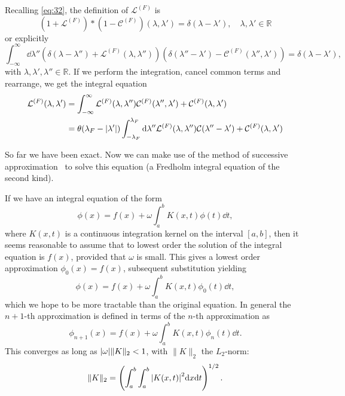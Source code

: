 \documentclass[11pt, a4paper]{report} %
\begin{document}
Recalling \cref{eq:32}, the definition of \(\mathcal{L}^{(F)}\) is~\cite{Caux2015}
\begin{equation}
	\left(1 + \mathcal{L}^{(F)}\right) * \left(1 - \mathcal{C}^{(F)}\right)(\lambda,\lambda')=\delta(\lambda-\lambda'), \quad \lambda, \lambda' \in \mathbb{R}
\end{equation}
or explicitly
\begin{equation}
	\int_{-\infty}^{\infty} \dd \lambda'' \left( \delta(\lambda-\lambda'') + \mathcal{L}^{(F)}(\lambda,\lambda'')\right)\left(\delta(\lambda''-\lambda') - \mathcal{C}^{(F)}(\lambda'',\lambda')\right) = \delta(\lambda-\lambda'),
\end{equation}
with  \(\lambda, \lambda', \lambda'' \in \mathbb{R}\).
If we perform the integration, cancel common terms and rearrange, we get the integral equation
\begin{align}
	\mathcal{L}^{(F)}(\lambda,\lambda') &= \int_{-\infty}^{\infty} \mathcal{L}^{(F)}(\lambda,\lambda'') \mathcal{C}^{(F)}(\lambda'',\lambda') + \mathcal{C}^{(F)}(\lambda,\lambda')\\
	&= \theta(\lambda_F - \abs{\lambda'}) \int_{-\lambda_F}^{\lambda_F} \dd \lambda'' \mathcal{L}^{(F)}(\lambda,\lambda'') \mathcal{C}(\lambda''-\lambda') + \mathcal{C}^{(F)}(\lambda,\lambda')
\end{align}

So far we have been exact.
Now we can make use of the method of successive approximation~\cite{Zemyan2012} to solve this equation (a Fredholm integral equation of the second kind).

If we have an integral equation of the form
\begin{equation}
  \phi(x) = f(x) + \omega \int_{a}^b K(x,t)\phi(t) \dd t,
\end{equation}
where $K(x,t)$ is a continuous integration kernel on the interval $[a,b]$, then it seems reasonable to assume that to lowest order the solution of the integral equation is $f(x)$, provided that $\omega$ is small.
This gives a lowest order approximation $\phi_0(x) = f(x)$, subsequent substitution yielding 
\begin{equation}
  \phi(x) = f(x) + \omega \int_{a}^b K(x,t)\phi_0(t) \dd t,
\end{equation}
which we hope to be more tractable than the original equation.
In general the $n+1$-th approximation is defined in terms of the $n$-th approximation as
\begin{equation}
  \phi_{n+1}(x) = f(x) + \omega \int_{a}^b K(x,t)\phi_n(t) \dd t.
\end{equation}
This converges as long as $\abs{\omega} \lVert K \rVert_2 < 1$, with $\lVert K \rVert_2$ the $L_2$-norm:
\begin{equation}
  \lVert K \rVert_2 = \left( \int_{a}^b \int_a^b \abs{K(x,t)}^2 \dd x \dd t\right)^{1/2}.
\end{equation}
\end{document}
